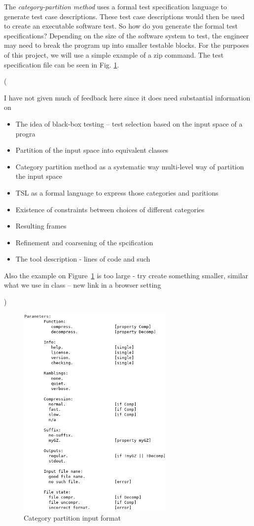 \documentclass[a4full,12pt]{article}
\newcommand{\eas}[1]{{\color{blue}\sf ({#1})}}
\begin{document}
The \emph{category-partition method} uses a formal test specification language to generate
  test case descriptions. These test case descriptions would then be used to
  create an executable software test. So how do you generate the formal test 
  specifications? Depending on the size of the software system to test, the 
  engineer may need to break the program up into smaller testable blocks. For 
  the purposes of this project, we will use a simple example of a zip command.
  The test specification file can be seen in Fig. \ref{fig:tsl_input}.\eas{I have not given much of feedback here since it does need substantial information on
  \begin{itemize}
  \item The idea of black-box testing -- test selection based on the input space of a progra
  \item Partition of the input space into equivalent classes
  \item Category partition method as a systematic way multi-level way of partition the input space
  \item TSL as a formal language to express those categories and paritions
  \item Existence of constraints between choices of different categories
  \item Resulting frames
  \item Refinement and coarsening of the spcification
  \item The tool description - lines of code and such
  \end{itemize}
  Also the example on Figure~\ref{fig:tsl_input} is too large - try create something smaller, similar what we use in class -- new link in a browser setting
  }
\begin{figure}[-htb]
\centering
\includegraphics[width=3in,keepaspectratio]{tsl_input.png}
\caption{Category partition input format}
\label{fig:tsl_input}
\end{figure}
\end{document}
